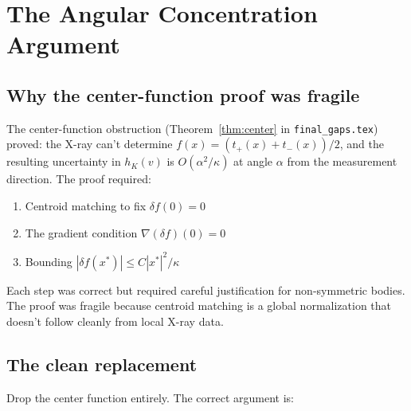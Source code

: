 %
%
%
%
%

\section{The Angular Concentration Argument}

\subsection{Why the center-function proof was fragile}

The center-function obstruction (Theorem~\ref{thm:center} in \texttt{final\_gaps.tex}) proved: the X-ray can't determine $f(x) = (t_+(x)+t_-(x))/2$, and the resulting uncertainty in $h_K(v)$ is $O(\alpha^2/\kappa)$ at angle $\alpha$ from the measurement direction. The proof required:
\begin{enumerate}
  \item Centroid matching to fix $\delta f(0) = 0$
  \item The gradient condition $\nabla(\delta f)(0) = 0$
  \item Bounding $|\delta f(x^*)| \leq C|x^*|^2/\kappa$
\end{enumerate}

Each step was correct but required careful justification for non-symmetric bodies. The proof was fragile because centroid matching is a global normalization that doesn't follow cleanly from local X-ray data.

\subsection{The clean replacement}

Drop the center function entirely. The correct argument is:


